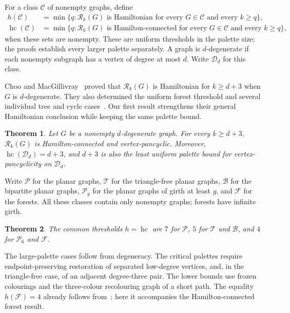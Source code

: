 \documentclass[11pt]{article}
\newtheorem{theorem}{Theorem}[section]
\theoremstyle{remark}
\newcommand{\Rk}{\mathcal R_k}
\newcommand{\hc}{\operatorname{hc}}
\numberwithin{equation}{section}
\numberwithin{table}{section}
\begin{document}
For a class $\mathcal C$ of nonempty graphs, define
\begin{align*}
 h(\mathcal C)&=\min\{q:\Rk(G)\text{ is Hamiltonian for every }G\in\mathcal C
                      \text{ and every }k\ge q\},\\
 \hc(\mathcal C)&=\min\{q:\Rk(G)\text{ is Hamilton-connected for every }G\in\mathcal C
                      \text{ and every }k\ge q\},
\end{align*}
when these sets are nonempty. These are uniform thresholds in the
palette size; the proofs establish every larger palette separately.
A graph is $d$-degenerate if each nonempty subgraph has a vertex of
degree at most $d$. Write $\mathcal D_d$ for this class.

Choo and MacGillivray~\cite[Theorem~3.4]{ChMa11} proved that
$\Rk(G)$ is Hamiltonian for $k\ge d+3$ when $G$ is $d$-degenerate.
They also determined the uniform forest threshold and several
individual tree and cycle cases~\cite[Sections~5--6]{ChMa11}.
Our first result strengthens their general Hamiltonian conclusion
while keeping the same palette bound.

\begin{theorem}\label{thm:main-degenerate}
Let $G$ be a nonempty $d$-degenerate graph. For every $k\ge d+3$,
$\Rk(G)$ is Hamilton-connected and vertex-pancyclic. Moreover,
$\hc(\mathcal D_d)=d+3$, and $d+3$ is also the least uniform palette
bound for vertex-pancyclicity on $\mathcal D_d$.
\end{theorem}

Write $\mathcal P$ for the planar graphs, $\mathcal T$ for the
triangle-free planar graphs, $\mathcal B$ for the bipartite planar
graphs, $\mathcal P_g$ for the planar graphs of girth at least $g$,
and $\mathcal F$ for the forests. All these classes contain only
nonempty graphs; forests have infinite girth.

\begin{theorem}\label{thm:main-planar}
The common thresholds $h=\hc$ are $7$ for $\mathcal P$,
$5$ for $\mathcal T$ and $\mathcal B$, and $4$ for
$\mathcal P_6$ and $\mathcal F$.
\end{theorem}

The large-palette cases follow from degeneracy. The critical palettes
require endpoint-preserving restoration of separated low-degree
vertices, and, in the triangle-free case, of an adjacent degree-three
pair. The lower bounds use frozen colourings and the three-colour
recolouring graph of a short path. The equality $h(\mathcal F)=4$
already follows from~\cite{ChMa11}; here it accompanies the
Hamilton-connected forest result.
\end{document}
